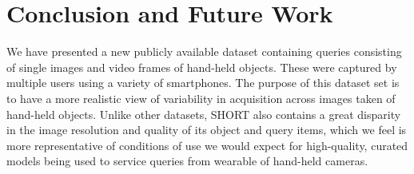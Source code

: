 


\section{Conclusion and Future Work} \label{sec:conclusions}

We have presented a new publicly available  dataset containing queries consisting of single images and video frames of hand-held objects.  These were captured by multiple users using a variety of smartphones. The purpose of this dataset set is to have a more realistic view of variability in acquisition across images taken of hand-held objects. Unlike other datasets, SHORT also contains a great disparity in the image resolution and quality of its object and query items, which we feel is more representative of conditions of use we would expect for high-quality, curated models being used to service queries from wearable of hand-held cameras.

